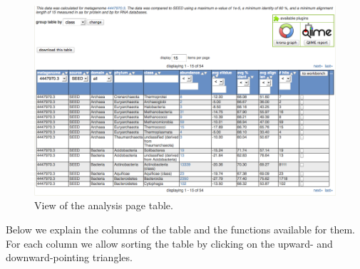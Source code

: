 \documentclass[12pt,fullpage]{report}
\begin{document}
\begin{figure}[ht]
\begin{center}
\includegraphics[width=6in]{Images/analysis-page-table.png}
\end{center}
\caption{
View of the analysis page table.
}
\label{fig:analysis-page-table}
\end{figure}

Below we explain the columns of the table and the functions available for them.
For each column we allow sorting the table by clicking on the upward- and downward-pointing triangles.
\end{document}
